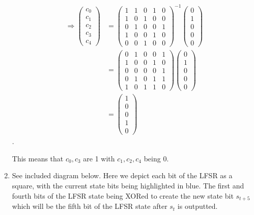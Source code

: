 \begin{enumerate}
\begin{align*}
\Rightarrow 
\begin{pmatrix}
c_0 \\ c_1 \\ c_2 \\ c_3 \\ c_4
\end{pmatrix}
&=
\begin{pmatrix}
1 & 1 & 0 & 1 & 0 \\
1 & 0 & 1 & 0 & 0 \\
0 & 1 & 0 & 0 & 1 \\
1 & 0 & 0 & 1 & 0 \\
0 & 0 & 1 & 0 & 0 
\end{pmatrix}^{-1}
\begin{pmatrix} 0 \\  1 \\ 0 \\ 0 \\ 0 \end{pmatrix} \\
&=
\begin{pmatrix}
0 & 1 & 0 & 0 & 1 \\
1 & 0 & 0 & 1 & 0 \\
0 & 0 & 0 & 0 & 1 \\
0 & 1 & 0 & 1 & 1 \\
1 & 0 & 1 & 1 & 0
\end{pmatrix}
\begin{pmatrix} 0 \\  1 \\ 0 \\ 0 \\ 0 \end{pmatrix} \\
&=
\begin{pmatrix} 1 \\  0 \\ 0 \\ 1 \\ 0 \end{pmatrix}
\end{align*}.

This means that $c_0, c_3$ are 1 with $c_1, c_2, c_4$ being 0.

\item See included diagram below. Here we depict each bit of the LFSR as a
square, with the current state bits being highlighted in blue. The first and
fourth bits of the LFSR state being XORed to create the new state bit $s_{t+5}$
which will be the fifth bit of the LFSR state after $s_t$ is outputted.



\end{enumerate}
